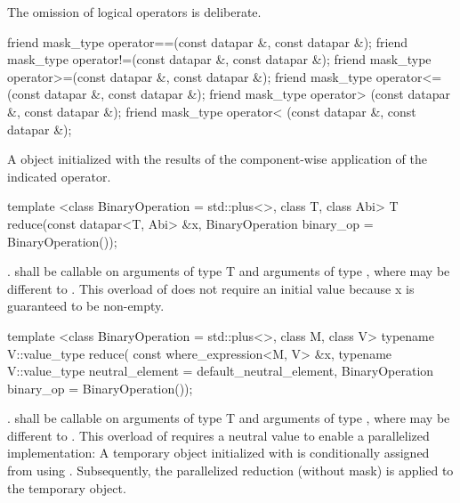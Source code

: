 \realnote The omission of logical operators is deliberate.

\begin{itemdecl}
friend mask_type operator==(const datapar &, const datapar &);
friend mask_type operator!=(const datapar &, const datapar &);
friend mask_type operator>=(const datapar &, const datapar &);
friend mask_type operator<=(const datapar &, const datapar &);
friend mask_type operator> (const datapar &, const datapar &);
friend mask_type operator< (const datapar &, const datapar &);
\end{itemdecl}
\begin{itemdescr}
  \pnum\returns A \mask object initialized with the results of the component-wise application of the indicated operator.
\end{itemdescr}

\begin{itemdecl}
template <class BinaryOperation = std::plus<>, class T, class Abi>
T reduce(const datapar<T, Abi> &x, BinaryOperation binary_op = BinaryOperation());
\end{itemdecl}
\begin{itemdescr}
  \pnum\returns {} \foralli.
  \pnum\requires {} shall be callable on arguments of type \type T and arguments of type \datapar[<T, A1>], where  may be different to .
  \pnum\realnote This overload of  does not require an initial value because \code x is guaranteed to be non-empty.
\end{itemdescr}

\begin{itemdecl}
template <class BinaryOperation = std::plus<>, class M, class V>
typename V::value_type reduce(
    const where_expression<M, V> &x,
    typename V::value_type neutral_element = default_neutral_element,
    BinaryOperation binary_op = BinaryOperation());
\end{itemdecl}
\begin{itemdescr}
  \pnum\returns {} .
  \pnum\requires {} shall be callable on arguments of type \type T and arguments of type \datapar[<T, A1>], where  may be different to .
  \pnum\realnote This overload of  requires a neutral value to enable a parallelized implementation:
  A temporary \datapar object initialized with  is conditionally assigned from  using .
  Subsequently, the parallelized reduction (without mask) is applied to the temporary object.
\end{itemdescr}

